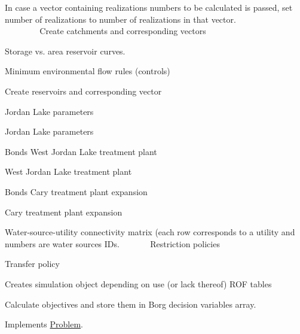 In case a vector containing realizations numbers to be calculated is passed, set number of realizations to number of realizations in that vector. ~\newline
~\newline
~\newline
~\newline
~\newline
~\newline
~\newline
~\newline
~\newline
~\newline
~\newline
~\newline
~\newline
~\newline
~\newline
 Create catchments and corresponding vectors

Storage vs. area reservoir curves.

Minimum environmental flow rules (controls)

Create reservoirs and corresponding vector

Jordan Lake parameters

Jordan Lake parameters

Bonds West Jordan Lake treatment plant

West Jordan Lake treatment plant

Bonds Cary treatment plant expansion

Cary treatment plant expansion

Water-\/source-\/utility connectivity matrix (each row corresponds to a utility and numbers are water sources I\+Ds. ~\newline
~\newline
~\newline
~\newline
 Restriction policies

Transfer policy

Creates simulation object depending on use (or lack thereof) R\+OF tables

Calculate objectives and store them in Borg decision variables array. 

Implements \mbox{\hyperlink{classProblem_acd924a80df4422c5199748c714e9405c}{Problem}}.

\mbox{\label{classTriangle_a045e3263a62a8a628fe5645f0323b7e4}} 
